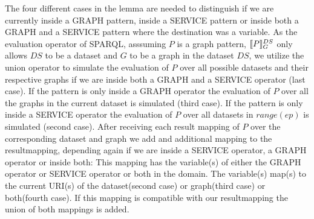 \begin{proofidea}
	The four different cases in the lemma are needed to distinguish if we are currently inside a GRAPH 
	pattern, inside a SERVICE pattern or inside both a GRAPH and a SERVICE
	pattern where the destination was a variable. As the evaluation operator of
	SPARQL, asssuming $P$ is a graph pattern, $\llbracket P \rrbracket^{DS}_G$ only allows $DS$ to be a dataset and $G$ to be
	a graph in the dataset $DS$, we utilize the union operator to simulate the
	evaluation of $P$ over all possible datasets and their respective graphs if we are
	inside both a GRAPH and a SERVICE operator (last case). If the pattern is only inside a GRAPH
	operator the evaluation of $P$ over all the graphs in the current dataset is
	simulated (third case). If the pattern is only inside a SERVICE operator the evaluation
	of $P$ over all datasets in $range(ep)$ is simulated (second case). After receiving each
	result mapping of $P$ over the corresponding dataset and graph we add
	and additional mapping to the resultmapping, depending again if we are inside a SERVICE operator, a
	GRAPH operator or inside both: This mapping has the variable(s) of
	either the GRAPH operator or SERVICE operator or both in the domain. The
	variable(s) map(s) to the current URI(s) of the dataset(second case) or
	graph(third case) or both(fourth case). If this mapping is compatible with
	our resultmapping the union of both mappings is added.


\end{proofidea}
